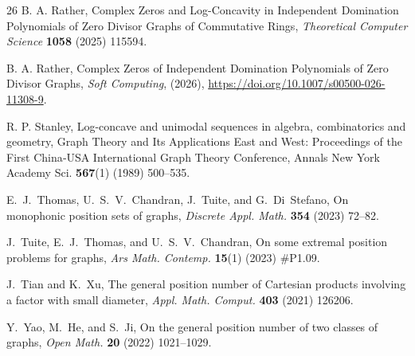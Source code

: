 \documentclass[12pt,twoside]{article}
\begin{document}
\begin{thebibliography}{26}
			   B. A. Rather, Complex Zeros and Log-Concavity in Independent Domination Polynomials of Zero Divisor Graphs of Commutative Rings,  {\emph{Theoretical Computer Science}} \textbf{1058} (2025) 115594.
			
			  B. A. Rather, Complex Zeros of Independent Domination Polynomials of Zero Divisor Graphs, \emph{Soft Computing}, (2026), \url{https://doi.org/10.1007/s00500-026-11308-9}.
			
			
			
			 R. P. Stanley, Log-concave and unimodal sequences in algebra, combinatorics and geometry, Graph Theory and Its Applications East and West: Proceedings of the First China‐USA International Graph Theory Conference, Annals New York Academy Sci. \textbf{567}(1) (1989) 500--535. 
			
			E.~J.~Thomas, U.~S.~V.~Chandran, J.~Tuite, and G.~Di~Stefano,
			On monophonic position sets of graphs,
			\emph{Discrete Appl. Math.} \textbf{354} (2023) 72--82.
			
			J.~Tuite, E.~J.~Thomas, and U.~S.~V.~Chandran,
			On some extremal position problems for graphs,
			\emph{Ars Math. Contemp.} \textbf{15}(1) (2023) \#P1.09.
			
			J.~Tian and K.~Xu,
			The general position number of Cartesian products involving a factor with small diameter,
			\emph{Appl. Math. Comput.} \textbf{403} (2021) 126206.
			
			Y.~Yao, M.~He, and S.~Ji,
			On the general position number of two classes of graphs,
			\emph{Open Math.} \textbf{20} (2022) 1021--1029.

		
	\end{thebibliography}
	
\end{document}
